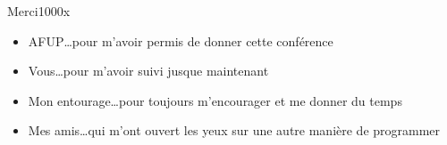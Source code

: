 \begin{frame}{Merci}{1000x}
    \begin{itemize}[<+->]
        \item AFUP\ldots pour m'avoir permis de donner cette conférence
        \item Vous\ldots pour m'avoir suivi jusque maintenant
        \item Mon entourage\ldots pour toujours m'encourager et me donner du temps
        \item Mes amis\ldots qui m'ont ouvert les yeux sur une autre manière de programmer
    \end{itemize}
\end{frame}
